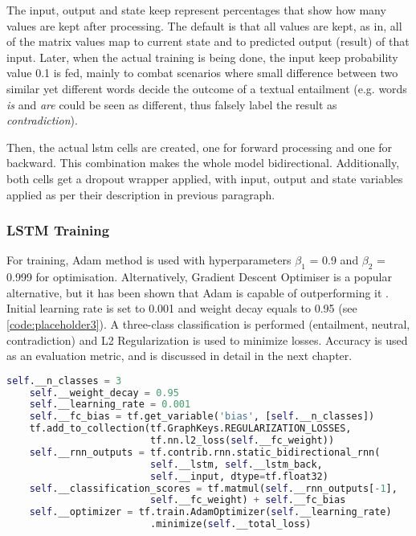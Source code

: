             The input, output and state keep represent percentages that show how many values are kept after processing. The default is that all values are kept, as in, all of the matrix values map to current state and to predicted output (result) of that input. Later, when the actual training is being done, the input keep probability value 0.1 is fed, mainly to combat scenarios where small difference between two similar yet different words decide the outcome of a textual entailment (e.g. words \textit{is} and \textit{are} could be seen as different, thus falsely label the result as \textit{contradiction}).
            
            Then, the actual \gls{lstm} cells are created, one for forward processing and one for backward. This combination makes the whole model bidirectional. Additionally, both cells get a dropout wrapper applied, with input, output and state variables applied as per their description in previous paragraph.
            
        \subsubsection{LSTM Training}
            
            For training, Adam method is used with hyperparameters $\beta_1$ = 0.9 and $\beta_2$ = 0.999 for optimisation. Alternatively, Gradient Descent Optimiser is a popular alternative, but it has been shown that Adam is capable of outperforming it \autocite{Kingma2015AdamAM}. Initial learning rate is set to 0.001 and weight decay equals to 0.95 (see \cref{code:placeholder3}). A three-class classification is performed (entailment, neutral, contradiction) and L2 Regularization is used to minimize losses. Accuracy is used as an evaluation metric, and is discussed in detail in the next chapter.
            
            \begin{lstlisting}[language=Python, caption=LSTM Training Parameters, label=code:placeholder3]
    self.__n_classes = 3
    self.__weight_decay = 0.95
    self.__learning_rate = 0.001
    self.__fc_bias = tf.get_variable('bias', [self.__n_classes])
    tf.add_to_collection(tf.GraphKeys.REGULARIZATION_LOSSES, 
                         tf.nn.l2_loss(self.__fc_weight))
    self.__rnn_outputs = tf.contrib.rnn.static_bidirectional_rnn(
                         self.__lstm, self.__lstm_back,
                         self.__input, dtype=tf.float32)
    self.__classification_scores = tf.matmul(self.__rnn_outputs[-1], 
                         self.__fc_weight) + self.__fc_bias
    self.__optimizer = tf.train.AdamOptimizer(self.__learning_rate)
                         .minimize(self.__total_loss)
            \end{lstlisting}
            \FloatBarrier
        

